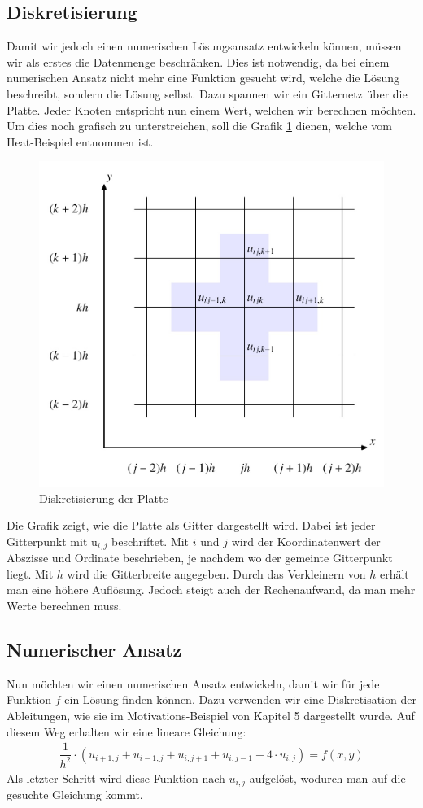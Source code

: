 \begin{refsection}
\subsection{Diskretisierung}
Damit wir jedoch einen numerischen L\"osungsansatz entwickeln k\"onnen,
m\"ussen wir als erstes die Datenmenge beschr\"anken. Dies ist notwendig,
da bei einem numerischen Ansatz nicht mehr eine Funktion gesucht wird,
welche die L\"osung beschreibt, sondern die L\"osung selbst. Dazu
spannen wir ein Gitternetz \"uber die Platte. Jeder Knoten entspricht
nun einem Wert, welchen wir berechnen m\"ochten. Um dies noch grafisch zu
unterstreichen, soll die Grafik \ref{potential:gitternetz} dienen,
welche vom Heat-Beispiel
entnommen ist. 

\begin{figure}
\centering
\includegraphics[width=0.5\hsize]{potential/images/diskretisierung/gitternetz.jpg}
\caption{Diskretisierung der Platte\label{potential:gitternetz}}
\end{figure}

Die Grafik zeigt, wie die Platte als Gitter dargestellt
wird. Dabei ist jeder Gitterpunkt mit u$_{i,j}$ beschriftet. Mit $i$ und
$j$ wird der Koordinatenwert der Abszisse und Ordinate beschrieben, je
nachdem wo der gemeinte Gitterpunkt liegt. Mit $h$ wird die Gitterbreite
angegeben. Durch das Verkleinern von $h$ erh\"alt man eine h\"ohere
Aufl\"osung. Jedoch steigt auch der Rechenaufwand, da man mehr Werte
berechnen muss.

\subsection{Numerischer Ansatz}
Nun m\"ochten wir einen numerischen Ansatz entwickeln, damit wir f\"ur
jede Funktion $f$ ein L\"osung finden k\"onnen. Dazu verwenden wir eine
Diskretisation der Ableitungen, wie sie im Motivations-Beispiel von
Kapitel 5 dargestellt wurde. Auf diesem Weg erhalten wir eine lineare
Gleichung:
\begin{eqnarray}\label{eq:gleichung}
\dfrac{1}{h^{2}}\cdot(u_{i+1,j}+u_{i-1,j}+u_{i,j+1}+u_{i,j-1}-4\cdot u_{i,j}) = f(x,y)
\end{eqnarray}
Als letzter Schritt wird diese Funktion nach $u_{i,j}$ aufgel\"ost,
wodurch man auf die gesuchte Gleichung kommt.


\end{refsection}
